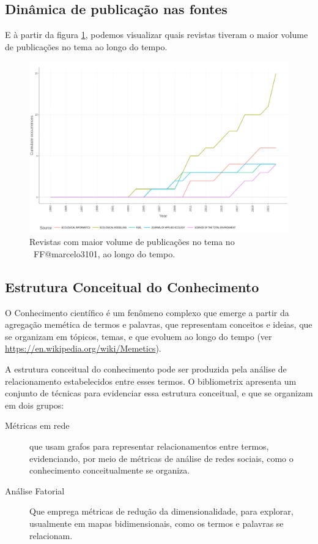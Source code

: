 \subsection{Dinâmica de publicação nas fontes}

E à partir da figura \ref{fig:FF@marcelo3101:Source-Dynamics.png}, podemos visualizar quais revistas tiveram o maior volume de publicações no tema ao longo do tempo.

\begin{figure}
    \centering
    \includegraphics[width=1\textwidth]{exploratory-data-analysis/marcelo3101/PesqBibliogr/ForestFire/WoS-20221204/assets/SourceDynamics.png}
    \caption{Revistas com maior volume de publicações no tema no  \dataset\ FF@marcelo3101, ao longo do tempo.}
    \label{fig:FF@marcelo3101:Source-Dynamics.png}
\end{figure}

\subsection{Estrutura Conceitual do Conhecimento}

O Conhecimento científico é um fenômeno complexo que emerge a partir da agregação memética de termos e palavras, que representam conceitos e ideias, que se organizam em tópicos, temas, e que evoluem ao longo do tempo (ver \url{https://en.wikipedia.org/wiki/Memetics}).

A estrutura conceitual do conhecimento pode ser produzida pela análise de relacionamento estabelecidos entre esses termos. O bibliometrix apresenta um conjunto de técnicas para evidenciar essa estrutura conceitual, e que se organizam em dois grupos:
\begin{description}
    \item [Métricas em rede] que usam grafos para representar relacionamentos entre termos, evidenciando, por meio de métricas de análise de redes sociais, como o conhecimento conceitualmente se organiza.
    \item [Análise Fatorial] Que emprega métricas de redução da dimensionalidade, para explorar, usualmente em mapas bidimensionais, como os termos e palavras se relacionam. 
\end{description}

